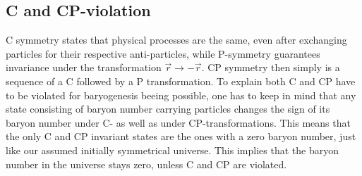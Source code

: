 \subsection{C and CP-violation}
C symmetry states that physical processes are the same, even after exchanging particles for their respective anti-particles, while P-symmetry guarantees invariance under the transformation $\vec{r}\rightarrow-\vec{r}$. CP symmetry then simply is a sequence of a C followed by a P transformation. \newline\indent \indent
To explain both C and CP have to be violated for baryogenesis beeing possible, one has to keep in mind that any state consisting of baryon number carrying particles changes the sign of its baryon number under C- as well as under CP-transformations\cite[p. 4]{Petropoulos:2003pm}. This means that the only C and CP invariant states are the ones with a zero baryon number, just like our assumed initially symmetrical universe.
This implies that the baryon number in the universe stays zero, unless C and CP are violated\cite[p. 4]{Petropoulos:2003pm}. \newline \indent
